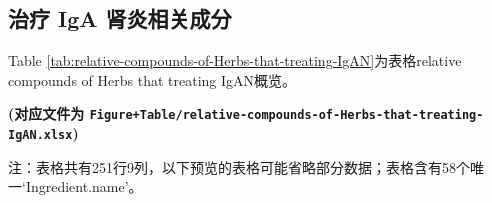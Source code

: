 \documentclass[
]{article}
\begin{document}
\hypertarget{ux6cbbux7597-iga-ux80beux708eux76f8ux5173ux6210ux5206}{%
\subsection{治疗 IgA 肾炎相关成分}\label{ux6cbbux7597-iga-ux80beux708eux76f8ux5173ux6210ux5206}}

Table \ref{tab:relative-compounds-of-Herbs-that-treating-IgAN}为表格relative compounds of Herbs that treating IgAN概览。

\textbf{(对应文件为 \texttt{Figure+Table/relative-compounds-of-Herbs-that-treating-IgAN.xlsx})}

\begin{center}\begin{tcolorbox}[colback=gray!10, colframe=gray!50, width=0.9\linewidth, arc=1mm, boxrule=0.5pt]注：表格共有251行9列，以下预览的表格可能省略部分数据；表格含有58个唯一`Ingredient.name'。
\end{tcolorbox}
\end{center}
\end{document}
